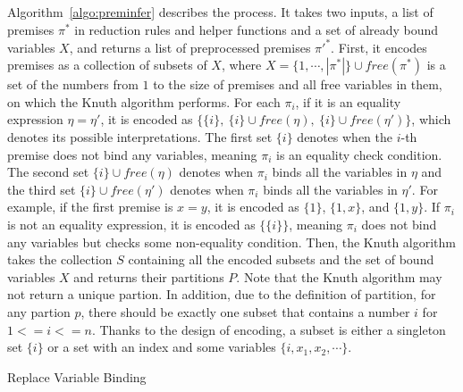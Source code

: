 Algorithm~\ref{algo:preminfer} describes the process.
It takes two inputs, a list of premises $\pi^*$ in reduction rules and helper functions
and a set of already bound variables $X$, and returns a list of preprocessed premises $\pi'^*$.
First, it encodes premises as a collection of subsets of $X$,
where $X = \{1, \cdots, |\pi^*|\} \cup \mathit{free}(\pi^*)$
is a set of the numbers from $1$ to the size of premises
and all free variables in them, on which the Knuth algorithm performs.
For each $\pi_i$, if it is an equality expression $\eta = \eta'$,
it is encoded as $\{\{i\},\ \{i\}\cup\mathit{free}(\eta),\ \{i\}\cup\mathit{free}(\eta')\}$,
which denotes its possible interpretations.
The first set $\{i\}$ denotes when the $i$-th premise does not bind any variables,
meaning $\pi_i$ is an equality check condition.
The second set $\{i\} \cup \mathit{free}(\eta)$ denotes when $\pi_i$ binds all the variables in $\eta$ and
the third set $\{i\} \cup \mathit{free}(\eta')$ denotes when $\pi_i$ binds all the variables in $\eta'$.
For example, if the first premise is $x = y$, it is encoded as $\{1\}$, $\{1, x\}$, and $\{1, y\}$.
If $\pi_i$ is not an equality expression, it is encoded as $\{\{i\}\}$,
meaning $\pi_i$ does not bind any variables but checks some non-equality condition.
Then, the Knuth algorithm takes the collection $S$ containing all the encoded subsets and
the set of bound variables $X$ and returns their partitions $P$.
Note that the Knuth algorithm may not return a unique partion.
In addition, due to the definition of partition, for any partion $p$,
there should be exactly one subset that contains a number $i$ for $1 <= i <= n$.
Thanks to the design of encoding, a subset is either a singleton set $\{i\}$ or
a set with an index and some variables $\{i, x_1, x_2, \cdots\}$.

\begin{algorithm}[t]
\DontPrintSemicolon
{}
 {
}
\caption{Replace Variable Binding}
\label{algo:binding}
\end{algorithm}

